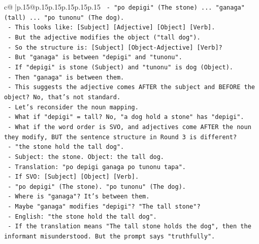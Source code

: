 \documentclass{article}
\begin{document}
{\begin{supertabular}{c@{$\;$}|p{.15\linewidth}@{}p{.15\linewidth}p{.15\linewidth}p{.15\linewidth}p{.15\linewidth}p{.15\linewidth}}
{{{\texttt{              {-} "po depigi" (The stone) ... "ganaga" (tall) ... "po tunonu" (The dog).} \\
\texttt{              {-} This looks like: {[}Subject{]} {[}Adjective{]} {[}Object{]} {[}Verb{]}.} \\
\texttt{              {-} But the adjective modifies the object ("tall dog").} \\
\texttt{              {-} So the structure is: {[}Subject{]} {[}Object{-}Adjective{]} {[}Verb{]}?} \\
\texttt{              {-} But "ganaga" is between "depigi" and "tunonu".} \\
\texttt{              {-} If "depigi" is stone (Subject) and "tunonu" is dog (Object).} \\
\texttt{              {-} Then "ganaga" is between them.} \\
\texttt{              {-} This suggests the adjective comes AFTER the subject and BEFORE the object? No, that's not standard.} \\
\texttt{              {-} Let's reconsider the noun mapping.} \\
\texttt{              {-} What if "depigi" = tall? No, "a dog hold a stone" has "depigi".} \\
\texttt{              {-} What if the word order is SVO, and adjectives come AFTER the noun they modify, BUT the sentence structure in Round 3 is different?} \\
\texttt{              {-} "the stone hold the tall dog".} \\
\texttt{              {-} Subject: the stone. Object: the tall dog.} \\
\texttt{              {-} Translation: "po depigi ganaga po tunonu tapa".} \\
\texttt{              {-} If SVO: {[}Subject{]} {[}Object{]} {[}Verb{]}.} \\
\texttt{              {-} "po depigi" (The stone). "po tunonu" (The dog).} \\
\texttt{              {-} Where is "ganaga"? It's between them.} \\
\texttt{              {-} Maybe "ganaga" modifies "depigi"? "The tall stone"?} \\
\texttt{              {-} English: "the stone hold the tall dog".} \\
\texttt{              {-} If the translation means "The tall stone holds the dog", then the informant misunderstood. But the prompt says "truthfully".} \\
}}}
\end{supertabular}}
\end{document}
